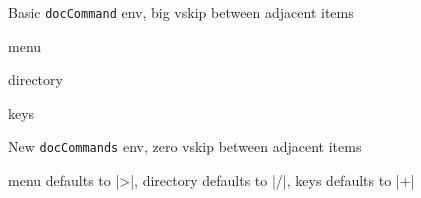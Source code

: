 \documentclass{article}
\begin{document}
\begin{example}{Basic \texttt{docCommand} env, big vskip between adjacent items}
  
  \begin{docCommand}
    [doc description=\oarg{input sep} defaults to |>|]
    {menu}
    {}
  \end{docCommand}
  \begin{docCommand}{directory}{}
  \end{docCommand}
  \begin{docCommand}{keys}{}
    \lipsum[23]
  \end{docCommand}
\end{example}


\begin{example}{New \texttt{docCommands} env, zero vskip between adjacent items}
  \begin{docCommands}{
    {menu}
      {}
      { defaults to |>|},
    {directory}
      {}
      { defaults to |/|},
    {keys}
      {}
      { defaults to |+|}}
    \lipsum[23]
  \end{docCommands}
\end{example}
\end{document}
